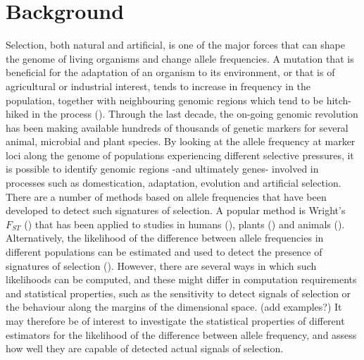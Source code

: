 \documentclass{bmcart}
\begin{document}


\section*{Background}
Selection, both natural and artificial, is one of the major forces that
can shape the genome of living organisms and change allele frequencies.
A mutation that is beneficial for the adaptation of an organism to its
environment, or that is of agricultural or industrial interest, tends to increase in
frequency in the population, together with neighbouring genomic regions
which tend to be hitch-hiked in the process (\cite{braverman1995hitchhiking}). 
Through the last decade, the on-going genomic revolution has been making
available hundreds of thousands of genetic markers for several animal, microbial and
plant species. By looking at the allele frequency at marker loci along
the genome of populations experiencing different selective pressures, it
is possible to identify genomic regions -and ultimately genes- involved
in processes such as domestication, adaptation, evolution and artificial
selection. There are a number of methods based on allele frequencies
that have been developed to detect such signatures of selection. A
popular method is Wright's $F_{ST}$
(\cite{wright1949genetical,nei1977f}) that has been applied to
studies in humans (\cite{akey2002interrogating}), plants
(\cite{zhao2010genomic}) and animals (\cite{kijas2012genome}).
Alternatively, the likelihood of the difference between allele
frequencies in different populations can be estimated and used to detect
the presence of signatures of selection
(\cite{nielsen2005genomic,stella2010identification}).
However, there are several ways in which such likelihoods can be
computed, and these might differ in computation requirements and
statistical properties, such as the sensitivity to detect signals of
selection or the behaviour along the margins of the dimensional space.
(add examples?)
It may therefore be of interest to investigate the statistical
properties of different estimators
for the likelihood of the difference between allele frequency, and
assess how well they are capable of detected actual signals of
selection.
\end{document}
